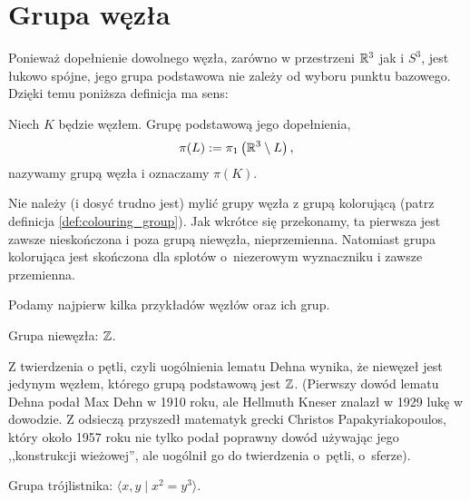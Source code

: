 
\section{Grupa węzła}
Ponieważ dopełnienie dowolnego węzła, zarówno w przestrzeni $\mathbb R^3$ jak i $S^3$, jest łukowo spójne, jego grupa podstawowa nie zależy od wyboru punktu bazowego.
Dzięki temu poniższa definicja ma sens:

\begin{definition}
%
    Niech $K$ będzie węzłem.
    Grupę podstawową jego dopełnienia,
    \begin{equation}
        \pi(L) := \pi_1 \left(\mathbb R^3 \setminus L\right),
    \end{equation}
    nazywamy grupą węzła i oznaczamy $\pi(K)$.
\end{definition}

Nie należy (i dosyć trudno jest) mylić grupy węzła z grupą kolorującą (patrz definicja \ref{def:colouring_group}).
Jak wkrótce się przekonamy, ta pierwsza jest zawsze nieskończona i poza grupą niewęzła, nieprzemienna.
Natomiast grupa kolorująca jest skończona dla splotów o~niezerowym wyznaczniku i zawsze przemienna.

Podamy najpierw kilka przykładów węzłów oraz ich grup.

\begin{example}
    Grupa niewęzła: $\mathbb Z$.
\end{example}

Z twierdzenia o pętli, czyli uogólnienia lematu Dehna wynika, że niewęzeł jest jedynym węzłem, którego grupą podstawową jest $\mathbb Z$.
(Pierwszy dowód lematu Dehna podał Max Dehn w 1910 roku, ale Hellmuth Kneser znalazł w 1929 lukę w dowodzie.
Z odsieczą przyszedł matematyk grecki Christos Papakyriakopoulos, który około 1957 roku nie tylko podał poprawny dowód używając jego ,,konstrukcji wieżowej'', ale uogólnił go do twierdzenia o~pętli, o~sferze).

\begin{example}
\label{exm:trefoil_group}%
    Grupa trójlistnika: $\langle x, y \mid x^2 = y^3\rangle$.
\end{example}


